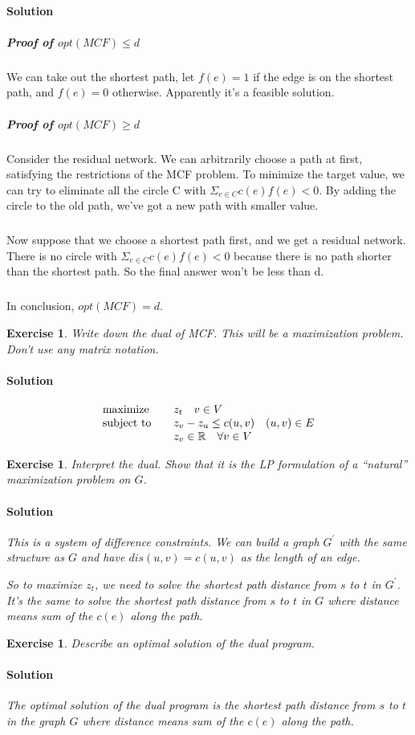 \documentclass[12pt,a4]{article}
\newtheorem{exercise}[theorem]{Exercise}
\begin{document}
\paragraph{Solution}
\subparagraph{Proof of $opt(MCF)\leq d$} We can take out the shortest path, let $f(e) = 1$ if the edge is on the shortest path, and $f(e) = 0$ otherwise. Apparently it's a feasible solution.
\subparagraph{Proof of $opt(MCF)\geq d$} Consider the residual network. We can arbitrarily choose a path at first, satisfying the restrictions of the MCF problem. To minimize the target value, we can try to eliminate all the circle C with $\Sigma_{e\in C}c(e)f(e) < 0$. By adding the circle to the old path, we've got a new path with smaller value.
\subparagraph{}Now suppose that we choose a shortest path first, and we get a residual network. There is no circle with $\Sigma_{e\in C}c(e)f(e) < 0$ because there is no path shorter than the shortest path. So the final answer won't be less than d.
\subparagraph{}In conclusion, $opt(MCF) = d$.

\begin{exercise}
    Write down the dual of MCF. This will be a maximization problem. Don't use any matrix notation.

\paragraph{Solution}
\begin{align*}
    \begin{array}{ll}
        \textnormal{maximize}\quad & z_t \quad v \in V  \\
        \textnormal{subject to} \quad & z_v-z_u \leq c(u,v) \quad (u,v) \in E \\
        & z_v \in \mathbb{R} \quad  \forall v \in V
    \end{array}
\end{align*}

\end{exercise}

\begin{exercise}
   Interpret the dual. Show that it is the LP formulation of a ``natural'' maximization problem on $G$.

\paragraph{Solution}
This is a system of difference constraints. We can build a graph $G^'$ with the same structure as $G$ and have $dis(u,v) = c(u,v)$ as the length of an edge.

So to maximize $z_t$, we need to solve the shortest path distance from $s$ to $t$ in $G^'$. It's the same to solve the shortest path distance from $s$ to $t$ in $G$ where distance means sum of the $c(e)$ along the path.

\end{exercise}

\begin{exercise}
  Describe an optimal solution of the dual program.
  
\paragraph{Solution}
The optimal solution of the dual program is the shortest path distance from $s$ to $t$ in the graph $G$ where distance means sum of the $c(e)$ along the path.

\end{exercise}
   
   
   
\end{document}
